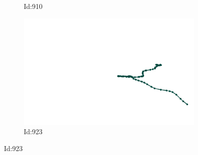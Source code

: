 \documentclass[12pt,twoside]{report}
\begin{document}
\begin{figure}
\begin{subfigure}[b]{0.20\textwidth}
\caption{Id:910}
\end{subfigure}
\begin{subfigure}[b]{0.20\textwidth}
\centering
\includegraphics[width=\textwidth]{../trajectories/923.png}
\caption{Id:923}
\end{subfigure}
\end{figure}
\end{document}
